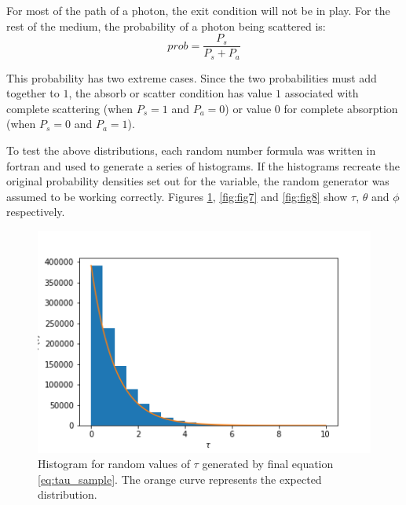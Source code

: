 \documentclass[twocolumn]{article}
\begin{document}

For most of the path of a photon, the exit condition will not be in play. For the rest of the medium, the probability of a photon being scattered is:
\begin{equation}
prob = \frac{P_s}{P_s + P_a}
\end{equation}

This probability has two extreme cases. Since the two probabilities must add together to $1$, the absorb or scatter condition has value $1$ associated with complete scattering (when $P_s = 1$ and $P_a=0$) or value $0$ for complete absorption (when $P_s = 0$ and $P_a=1$).

To test the above distributions, each random number formula was written in fortran and used to generate a series of histograms. If the histograms recreate the original probability densities set out for the variable, the random generator was assumed to be working correctly. Figures \ref{fig:fig6}, \ref{fig:fig7} and \ref{fig:fig8} show $\tau$, $\theta$ and $\phi$ respectively.

\begin{figure}
\centering
\includegraphics[width=\linewidth]{fig6}
\caption{Histogram for random values of $\tau$ generated by final equation \ref{eq:tau_sample}. The orange curve represents the expected distribution.}
\label{fig:fig6}
\end{figure}
\end{document}
